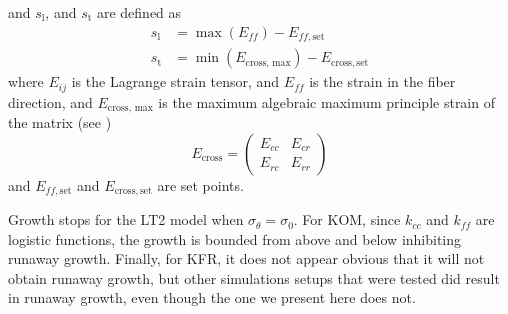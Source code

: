 and $s_\mathrm{l}$, and $s_\mathrm{t}$ are defined as
\begin{align*}
    s_\mathrm{l} &= \max(E_{ff}) - E_{ff, \mathrm{set}} \\
    s_\mathrm{t} &= \min(E_\text{cross, max}) - E_\mathrm{cross, set}
\end{align*}
where $E_{ij}$ is the Lagrange strain tensor, and $E_{ff}$ is the strain in the fiber direction, and $E_\text{cross, max}$ is the maximum algebraic maximum principle strain of the matrix (see \citep{Witzenburg2018})
\begin{equation*}
    E_\text{cross} = \begin{pmatrix}
        E_{cc} & E_{cr} \\
        E_{rc} & E_{rr}
    \end{pmatrix}
\end{equation*}
and $E_{ff, \mathrm{set}}$ and $E_\mathrm{cross, set}$ are set points. \par
Growth stops for the LT2 model when $\sigma_{\theta} = \sigma_{0}$. For KOM, since $k_{cc}$ and $k_{ff}$ are logistic functions, the growth is bounded from above and below inhibiting runaway growth. Finally, for KFR, it does not appear obvious that it will not obtain runaway growth, but other simulations setups that were tested did result in runaway growth, even though the one we present here does not.

